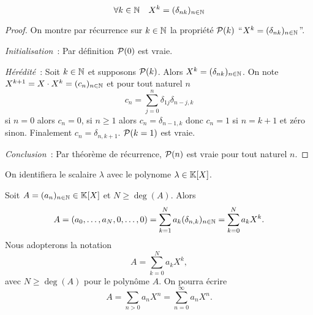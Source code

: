\begin{lemme}
  \begin{equation}
    \forall k\in \N \quad X^k = (\delta_{nk})_{n \in \N}
  \end{equation}
\end{lemme}
\begin{proof}
  On montre par récurrence sur \(k \in \N\) la propriété \(\P(k)\) ``\(X^k = (\delta_{nk})_{n \in \N}\)''.

  \emph{Initialisation}~: Par définition \(\P(0)\) est vraie.

  \emph{Hérédité}~: Soit \(k \in \N\) et supposons \(\P(k)\). Alors \(X^k=(\delta_{nk})_{n \in \N}\). On note \(X^{k+1}=X \cdot X^k=(c_n)_{n \in \N}\) et pour tout naturel \(n\)
  \begin{equation}
    c_n = \sum_{j=0}^n \delta_{1j} \delta_{n-j,k}
  \end{equation}
  si \(n=0\) alors \(c_n=0\), si \(n \geqslant 1\) alors \(c_n=\delta_{n-1,k}\) donc \(c_n=1\) si \(n=k+1\) et zéro sinon. Finalement \(c_n=\delta_{n,k+1}\). \(\P(k=1)\) est vraie.

  \emph{Conclusion}~: Par théorème de récurrence, \(\P(n)\) est vraie pour tout naturel \(n\).
\end{proof}

On identifiera le scalaire \(\lambda\) avec le polynome \(\lambda \in \K[X]\).

Soit \(A=(a_n)_{n \in \N} \in \K[X]\) et \(N \geqslant \deg(A)\). Alors
\begin{equation}
  A = (a_0, \ldots, a_N, 0, \ldots, 0) = \sum_{k=1}^N a_k (\delta_{n,k})_{n \in \N}=\sum_{k=0}^N a_k X^k.
\end{equation}
Nous adopterons la notation
\begin{equation}
  A = \sum_{k=0}^N a_k X^k,
\end{equation}
avec \(N \geqslant \deg(A)\) pour le polynôme \(A\). On pourra écrire
\begin{equation}
  A = \sum_{n>0} a_n X^n = \sum_{n=0}^{\infty} a_n X^n.
\end{equation}

